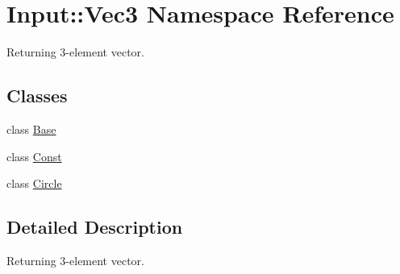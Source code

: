 \hypertarget{namespaceInput_1_1Vec3}{\section{\-Input\-:\-:\-Vec3 \-Namespace \-Reference}
\label{namespaceInput_1_1Vec3}
}


\-Returning 3-\/element vector.  


\subsection*{\-Classes}
\begin{DoxyCompactItemize}
\item 
class \hyperlink{classInput_1_1Vec3_1_1Base}{\-Base}
\item 
class \hyperlink{classInput_1_1Vec3_1_1Const}{\-Const}
\item 
class \hyperlink{classInput_1_1Vec3_1_1Circle}{\-Circle}
\end{DoxyCompactItemize}


\subsection{\-Detailed \-Description}
\-Returning 3-\/element vector. 